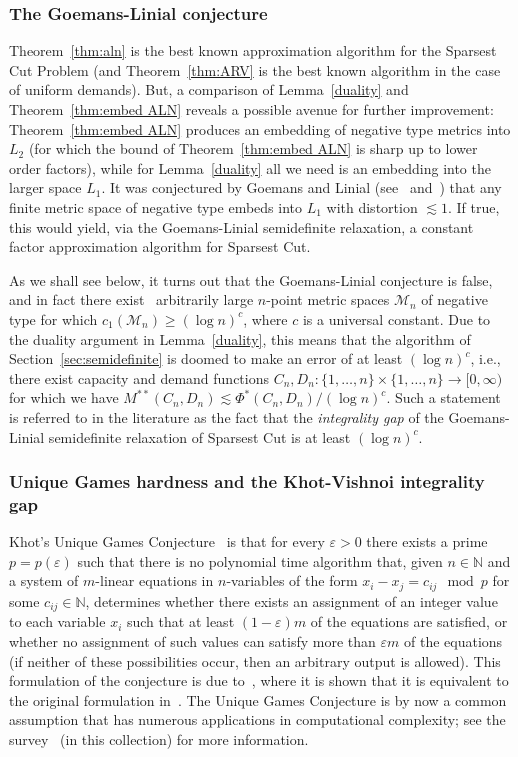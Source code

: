 \documentclass{icm2010}
\theoremstyle{definition}
\newcommand{\1}{\mathbf{1}}
\newcommand{\M}{\mathscr{M}}
\newcommand{\N}{\mathbb{N}}
\renewcommand{\ge}{\geqslant}
\newcommand{\e}{\varepsilon}
\begin{document}
\subsubsection{The Goemans-Linial conjecture}\label{sec:GL} Theorem~\ref{thm:aln}
is the best known approximation algorithm for the Sparsest Cut
Problem (and Theorem~\ref{thm:ARV} is the best known algorithm in
the case of uniform demands). But, a comparison of
Lemma~\ref{duality} and Theorem~\ref{thm:embed ALN} reveals a
possible avenue for further improvement: Theorem~\ref{thm:embed ALN}
produces an embedding of negative type metrics into $L_2$ (for which
the bound of Theorem~\ref{thm:embed ALN} is sharp up to lower order
factors), while for Lemma~\ref{duality} all we need is an embedding
into the larger space $L_1$. It was conjectured by Goemans and
Linial (see~\cite{Goe97,Lin-open,Lin02} and~\cite[pg.\
379--380]{Mat02}) that any finite metric space of negative type
embeds into $L_1$ with distortion $\lesssim 1$. If true, this would
yield, via the Goemans-Linial semidefinite relaxation, a constant
factor approximation algorithm for Sparsest Cut.

As we shall see below, it turns out that the Goemans-Linial
conjecture is false, and in fact there exist~\cite{CKN09}
arbitrarily large $n$-point metric spaces $\M_n$ of negative type
for which $c_1(\M_n)\ge (\log n)^c$, where $c$ is a universal
constant. Due to the duality argument in Lemma~\ref{duality}, this
means that the algorithm of Section~\ref{sec:semidefinite} is doomed
to make an error of at least $(\log n)^c$, i.e., there exist
capacity and demand functions $C_n,D_n:\{1,\ldots,n\}\times
\{1,\ldots,n\}\to [0,\infty)$ for which we have
$M^{**}(C_n,D_n)\lesssim \Phi^*(C_n,D_n)/(\log n)^c$. Such a
statement is referred to in the literature as the fact that the {\em
integrality gap} of the Goemans-Linial semidefinite relaxation of
Sparsest Cut is at least $(\log n)^c$.

\subsubsection{Unique Games hardness and the Khot-Vishnoi integrality
gap}\label{sec:UGC}\label{sec:unique} Khot's Unique Games
Conjecture~\cite{Khot02} is that for every $\e>0$ there exists a
prime $p=p(\e)$ such that there is no polynomial time algorithm
that, given $n\in \N$ and a system of $m$-linear equations in
$n$-variables of the form $x_i-x_j=c_{ij}\mod p$ for some $c_{ij}\in
\N$, determines whether there exists an assignment of an integer
value to each variable $x_i$ such that at least $(1-\e)m$ of the
equations are satisfied, or whether no assignment of such values can satisfy
more than $\e m$ of the equations (if neither of these possibilities occur, then an arbitrary output is allowed). This formulation of the
conjecture is due to~\cite{KKMO07}, where it is shown that it is equivalent to the
original formulation in~\cite{Khot02}. The Unique Games Conjecture
is by now a common assumption that has numerous applications in
computational complexity; see the survey~\cite{Khot10} (in this
collection) for more information.
\end{document}
